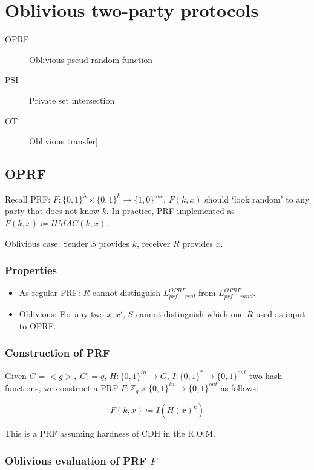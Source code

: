 \section{Oblivious two-party protocols}

\begin{description}
		\item[OPRF] Oblivious pseud-random function
		\item[PSI] Private set intersection
		\item[OT] Oblivious transfer]
\end{description}

\subsection{OPRF}

Recall PRF: $F : \{0, 1\}^\lambda \times \{0, 1\}^k \rightarrow \{1,
0\}^{out}$. $F(k, x)$ should `look random' to any party that does not know $k$.
In practice, PRF implemented as $F(k, x) \coloneqq HMAC(k, x)$.

Oblivious case: Sender $S$ provides $k$, receiver $R$ provides $x$.

\subsubsection{Properties}

\begin{itemize}
		\item As regular PRF: $R$ cannot distinguish $L^{OPRF}_{prf-real}$ from
				$L^{OPRF}_{prf-rand}$.
		\item Oblivious: For any two $x, x'$, $S$ cannot distinguish which one
				$R$ used as input to OPRF.
\end{itemize}


\subsubsection{Construction of PRF}

Given $G = <g>, |G| = q$, $H : \{0, 1\}^{in} \rightarrow G$, $I : \{0, 1\}^{*}
\rightarrow \{0, 1\}^{out}$ two hash functions, we construct a PRF $F:
\mathbb{Z}_q \times \{0, 1\}^{in} \rightarrow \{0, 1\}^{out}$ as follows:

\[
		F(k, x) \coloneqq I(H(x)^k)
\]

This is a PRF assuming hardness of CDH in the R.O.M.

\subsubsection{Oblivious evaluation of PRF $F$}

